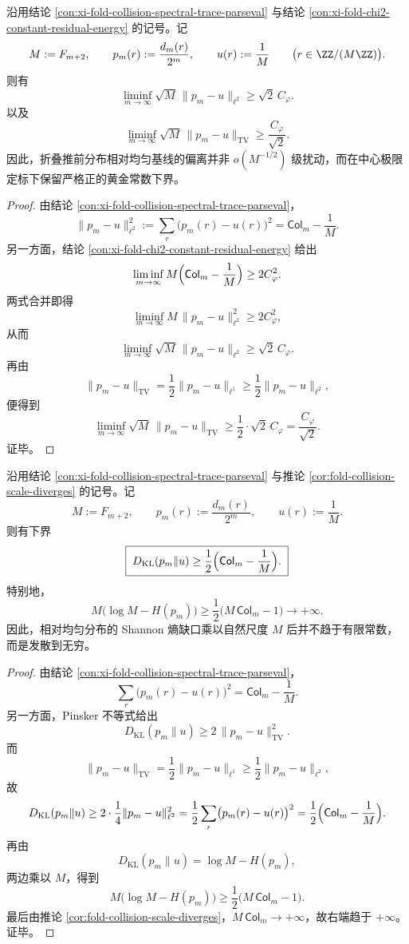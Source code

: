 \begin{theorem}\label{thm:xi-time-part66-uniform-baseline-sqrtM-rigidity}
沿用结论 \ref{con:xi-fold-collision-spectral-trace-parseval} 与结论
\ref{con:xi-fold-chi2-constant-residual-energy} 的记号。记
\[
M:=F_{m+2},
\qquad
p_m(r):=\frac{d_m(r)}{2^m},
\qquad
u(r):=\frac{1}{M}
\qquad
\bigl(r\in \ZZ/(M\ZZ)\bigr).
\]
则有
\[
\boxed{\;
\liminf_{m\to\infty}\sqrt{M}\,\|p_m-u\|_{\ell^2}
\ge
\sqrt{2}\,C_\varphi.\;}
\]
以及
\[
\boxed{\;
\liminf_{m\to\infty}\sqrt{M}\,\|p_m-u\|_{\mathrm{TV}}
\ge
\frac{C_\varphi}{\sqrt{2}}.\;}
\]
因此，折叠推前分布相对均匀基线的偏离并非 \(o(M^{-1/2})\) 级扰动，而在中心极限定标下保留严格正的黄金常数下界。
\end{theorem}
\begin{proof}
由结论 \ref{con:xi-fold-collision-spectral-trace-parseval}，
\[
\|p_m-u\|_{\ell^2}^2
:=
\sum_{r}\bigl(p_m(r)-u(r)\bigr)^2
=
\mathsf{Col}_m-\frac1M.
\]
另一方面，结论 \ref{con:xi-fold-chi2-constant-residual-energy} 给出
\[
\liminf_{m\to\infty}M\Bigl(\mathsf{Col}_m-\frac1M\Bigr)\ge 2C_\varphi^2.
\]
两式合并即得
\[
\liminf_{m\to\infty}M\,\|p_m-u\|_{\ell^2}^2\ge 2C_\varphi^2,
\]
从而
\[
\liminf_{m\to\infty}\sqrt{M}\,\|p_m-u\|_{\ell^2}\ge \sqrt2\,C_\varphi.
\]
再由
\[
\|p_m-u\|_{\mathrm{TV}}
=
\frac12\|p_m-u\|_{\ell^1}
\ge
\frac12\|p_m-u\|_{\ell^2},
\]
便得到
\[
\liminf_{m\to\infty}\sqrt{M}\,\|p_m-u\|_{\mathrm{TV}}
\ge
\frac{1}{2}\cdot \sqrt2\,C_\varphi
=
\frac{C_\varphi}{\sqrt2}.
\]
证毕。
\end{proof}

\begin{theorem}\label{thm:xi-time-part66-shannon-gap-times-M-diverges}
沿用结论 \ref{con:xi-fold-collision-spectral-trace-parseval} 与推论
\ref{cor:fold-collision-scale-diverges} 的记号。记
\[
M:=F_{m+2},
\qquad
p_m(r):=\frac{d_m(r)}{2^m},
\qquad
u(r):=\frac{1}{M}.
\]
则有下界
\[
\boxed{\;
D_{\mathrm{KL}}(p_m\|u)\ge \frac12\Bigl(\mathsf{Col}_m-\frac1M\Bigr).\;}
\]
特别地，
\[
\boxed{\;
M\bigl(\log M-H(p_m)\bigr)
\ge
\frac12\bigl(M\,\mathsf{Col}_m-1\bigr)
\longrightarrow +\infty.\;}
\]
因此，相对均匀分布的 Shannon 熵缺口乘以自然尺度 \(M\) 后并不趋于有限常数，而是发散到无穷。
\end{theorem}
\begin{proof}
由结论 \ref{con:xi-fold-collision-spectral-trace-parseval}，
\[
\sum_r\bigl(p_m(r)-u(r)\bigr)^2
=
\mathsf{Col}_m-\frac1M.
\]
另一方面，Pinsker 不等式给出
\[
D_{\mathrm{KL}}(p_m\|u)\ge 2\,\|p_m-u\|_{\mathrm{TV}}^2.
\]
而
\[
\|p_m-u\|_{\mathrm{TV}}
=
\frac12\|p_m-u\|_{\ell^1}
\ge
\frac12\|p_m-u\|_{\ell^2},
\]
故
\[
D_{\mathrm{KL}}(p_m\|u)
\ge
2\cdot \frac14\|p_m-u\|_{\ell^2}^2
=
\frac12\sum_r\bigl(p_m(r)-u(r)\bigr)^2
=
\frac12\Bigl(\mathsf{Col}_m-\frac1M\Bigr).
\]
再由
\[
D_{\mathrm{KL}}(p_m\|u)=\log M-H(p_m),
\]
两边乘以 \(M\)，得到
\[
M\bigl(\log M-H(p_m)\bigr)
\ge
\frac12\bigl(M\,\mathsf{Col}_m-1\bigr).
\]
最后由推论 \ref{cor:fold-collision-scale-diverges}，\(M\,\mathsf{Col}_m\to+\infty\)，故右端趋于 \(+\infty\)。证毕。
\end{proof}


